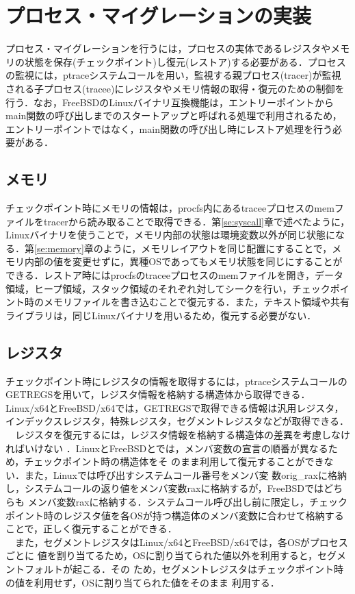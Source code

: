 \documentclass{ipsjpapers}
\begin{document}
\section{プロセス・マイグレーションの実装}
プロセス・マイグレーションを行うには，プロセスの実体であるレジスタやメモリの状態を保存(チェックポイント)し復元(レストア)する必要がある．プロセスの監視には，ptraceシステムコールを用い，監視する親プロセス(tracer)が監視される子プロセス(tracee)にレジスタやメモリ情報の取得・復元のための制御を行う．なお，FreeBSDのLinuxバイナリ互換機能は，エントリーポイントからmain関数の呼び出しまでのスタートアップと呼ばれる処理で利用されるため，エントリーポイントではなく，main関数の呼び出し時にレストア処理を行う必要がある．

\subsection{メモリ}
チェックポイント時にメモリの情報は，procfs内にあるtraceeプロセスのmemファイルをtracerから読み取ることで取得できる．第\ref{se:syscall}章で述べたように，Linuxバイナリを使うことで，メモリ内部の状態は環境変数以外が同じ状態になる．第\ref{se:memory}章のように，メモリレイアウトを同じ配置にすることで，メモリ内部の値を変更せずに，異種OSであってもメモリ状態を同じにすることができる．レストア時にはprocfsのtraceeプロセスのmemファイルを開き，データ領域，ヒープ領域，スタック領域のそれぞれ対してシークを行い，チェックポイント時のメモリファイルを書き込むことで復元する．また，テキスト領域や共有ライブラリは，同じLinuxバイナリを用いるため，復元する必要がない．

\subsection{レジスタ}
チェックポイント時にレジスタの情報を取得するには，ptraceシステムコールのGETREGSを用いて，レジスタ情報を格納する構造体から取得できる．Linux\slash{}x64とFreeBSD\slash{}x64では，GETREGSで取得できる情報は汎用レジスタ，インデックスレジスタ，特殊レジスタ，セグメントレジスタなどが取得できる．\\
　レジスタを復元するには，レジスタ情報を格納する構造体の差異を考慮しなければいけない
．LinuxとFreeBSDとでは，メンバ変数の宣言の順番が異なるため，チェックポイント時の構造体をそ
のまま利用して復元することができない．また，Linuxでは呼び出すシステムコール番号をメンバ変
数orig\_raxに格納し，システムコールの返り値をメンバ変数raxに格納するが，FreeBSDではどちらも
メンバ変数raxに格納する．システムコール呼び出し前に限定し，チェックポイント時のレジスタ値を各OSが持つ構造体のメンバ変数に合わせて格納することで，正しく復元することができる．\\
　また，セグメントレジスタはLinux\slash{}x64とFreeBSD\slash{}x64では，各OSがプロセスごとに
値を割り当てるため，OSに割り当てられた値以外を利用すると，セグメントフォルトが起こる．その
ため，セグメントレジスタはチェックポイント時の値を利用せず，OSに割り当てられた値をそのまま
利用する．
\end{document}
